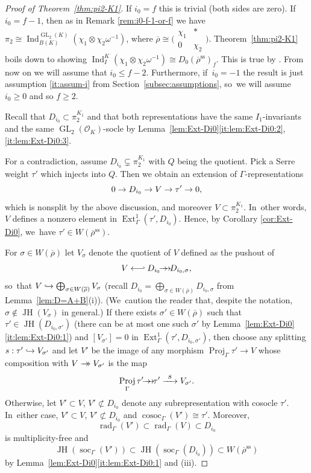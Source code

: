 \documentclass[JEP,XML,SOM,Unicode,NoFloatCountersInSection, NoEqCountersInSection,published]{cedram}
\newcommand\hto{\mathrel{\lhook\joinrel\to}}
\newcommand{\onto}{\mathchoice{\to\hspace*{-5mm}\to}{\mathrel{\hbox{$\to\hspace*{-2.85mm}\to$}}}{\to\hspace*{-3mm}\to}{\to\hspace*{-3mm}\to}}
\newcommand\from{\mathchoice{\longleftarrow}{\leftarrow}{\leftarrow}{\leftarrow}}
\def\hfrom{\mathrel{\from\joinrel\rhook}}
\newcommand{\To}[1]{\mathchoice{\xrightarrow{\textstyle\kern4pt#1\kern3pt}}{\stackrel{#1}{\longrightarrow}}{}{}}
\let\ovl\overline
\newcommand{\cO}{\mathcal{O}}
\renewcommand{\ss}{\mathrm{ss}}
\newcommand{\brho}{\overline{\rho}}
\DeclareMathOperator{\cosoc}{cosoc}
\DeclareMathOperator{\Ext}{Ext}
\DeclareMathOperator{\GL}{GL}
\DeclareMathOperator{\Ind}{Ind}
\DeclareMathOperator{\JH}{\mathrm{JH}}
\DeclareMathOperator{\Proj}{Proj}
\DeclareMathOperator{\rad}{rad}
\DeclareMathOperator{\soc}{soc}
\newcommand{\smatr}[4]{\bigl(\begin{smallmatrix} {#1}& {#2}\\ {#3}&{#4}\end{smallmatrix}\bigr)}
\theoremstyle{plain}
\theoremstyle{definition}
\begin{document}
\begin{proof}[Proof of Theorem~\ref{thm:pi2-K1}]

If $i_0 = f$ this is trivial (both sides are zero).
If $i_0 = f-1$, then as in Remark \ref{rem:i0-f-1-or-f} we have $\pi_2 \cong \Ind_{B(K)}^{\GL_2(K)} (\chi_1 \otimes \chi_2\omega^{-1})$, where $\ovl\rho \cong \smatr{\chi_1} * 0 {\chi_2}$.
Theorem~\ref{thm:pi2-K1} boils down to showing $\Ind_I^K (\chi_1 \otimes \chi_2\omega^{-1}) \cong D_0(\brho^\ss)_f$.
This is true by \cite[Rem.\,14.9(i)]{BP}.
From now on we will assume that $i_0 \le f-2$. Furthermore, if~$i_0=-1$ the result is just assumption \eqref{it:assum-i} from Section~\ref{subsec:assumptions}, so~we will assume $i_0\geq 0$ and so $f\geq 2$.

Recall that $D_{i_0} \subset \pi_2^{K_1}$ and that both representations have the same $I_1$-invariants and the same $\GL_2(\cO_K)$-socle by Lemma~\ref{lem:Ext-Di0}\eqref{it:lem:Ext-Di0:2}, \eqref{it:lem:Ext-Di0:3}.

For a contradiction, assume $D_{i_0}\subsetneq \pi_2^{K_1}$ with $Q$ being the quotient. Pick a Serre weight $\tau'$ which injects into $Q$. Then we obtain an extension of $\Gamma$-representations
\[
0\to D_{i_0}\to V\to \tau'\rightarrow0,
\]
which is nonsplit by the above discussion, and moreover $V \subset \pi_2^{K_1}$. In~other words, $V$ defines a nonzero element in $\Ext^1_{\Gamma}(\tau',D_{i_0})$. Hence, by Corollary \ref{cor:Ext-Di0}, we~have $\tau'\in W(\brho^\ss)$.

For $\sigma \in W(\brho)$ let $V_\sigma$ denote the quotient of $V$ defined as the pushout of
\[
V \hfrom D_{i_0} \onto D_{i_0,\sigma},
\]
so~that $V \hto \bigoplus_{\sigma \in W(\brho)} V_\sigma$ (recall $D_{i_0} = \bigoplus_{\sigma \in W(\brho)} D_{i_0,\sigma}$ from Lemma~\ref{lem:D=A+B}(i)).
(We~caution the reader that, despite the notation, $\sigma \notin \JH(V_\sigma)$ in general.)
If there exists $\sigma' \in W(\brho)$ such that $\tau' \in \JH(D_{i_0,\sigma'})$ (there can be at most one such $\sigma'$ by Lemma~\ref{lem:Ext-Di0}\eqref{it:lem:Ext-Di0:1}) and $[V_{\sigma'}] = 0$ in $\Ext^1_\Gamma(\tau',D_{i_0,\sigma'})$, then
choose any splitting $s: \tau' \hto V_{\sigma'}$ and let $V'$ be the image of any morphism $\Proj_\Gamma \tau' \to V$ whose composition with $V \onto V_{\sigma'}$ is the map
\[
\Proj_\Gamma \tau' \onto \tau' \To{s} V_{\sigma'}.
\]
Otherwise, let $V' \subset V$, $V' \not\subset D_{i_0}$ denote any subrepresentation with cosocle $\tau'$. In~either case, $V' \subset V$, $V' \not\subset D_{i_0}$ and $\cosoc_{\Gamma}(V') \cong \tau'$.
Moreover,
\[
\rad_{\Gamma}(V') \subset \rad_{\Gamma}(V) \subset D_{i_0}
\]
is multiplicity-free and
\begin{equation}\label{eq:soc-V'}
\JH(\soc_{\Gamma}(V')) \subset \JH(\soc_{\Gamma}(D_{i_0})) \subset W(\brho^\ss)
\end{equation}
by Lemma~\ref{lem:Ext-Di0}\eqref{it:lem:Ext-Di0:1} and (iii).


\end{proof}
\end{document}

